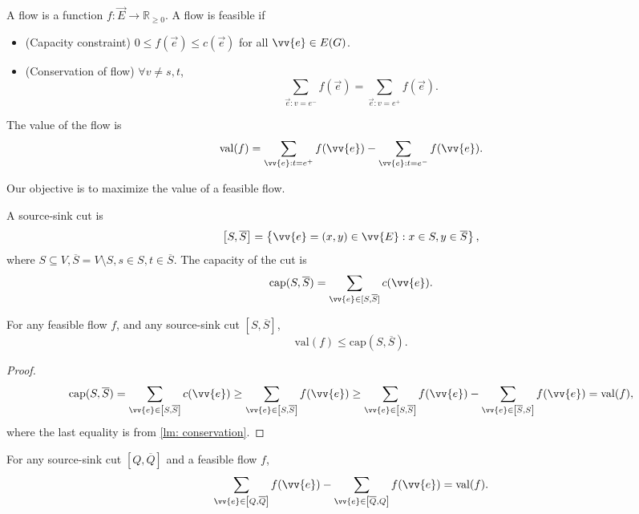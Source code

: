 \begin{definition}
    A flow is a function \(f: \vec{E} \to \mathbb{R} _{\ge 0}\). A flow is feasible if 
    \begin{itemize}
        \item (Capacity constraint) \(0 \le f(\vec{e}) \le c(\vec{e})\) for all \(\vv{e} \in E(G)\). 
        \item (Conservation of flow) \(\forall v \neq s, t\), 
        \[
            \sum_{\vec{e}: v = e^-} f(\vec{e}) = \sum_{\vec{e}: v = e^+} f(\vec{e}). 
        \]
    \end{itemize} 
    The value of the flow is 
    \[
        \mathrm{val}(f) = \sum_{\vv{e}: t = e^+} f(\vv{e}) - \sum_{\vv{e}: t = e^-} f(\vv{e}).   
    \]
\end{definition}

Our objective is to maximize the value of a feasible flow.

\begin{definition}
    A source-sink cut is 
    \[
        \left[ S, \overline{S} \right] = \left\{ \vv{e} = (x, y) \in \vv{E}: x \in S, y \in \overline{S} \right\},  
    \]
    where \(S \subseteq V, \overline{S} = V \setminus S, s \in S, t \in \overline{S}\). The capacity of the cut is 
    \[
        \mathrm{cap}(S, \overline{S}) = \sum_{\vv{e} \in [S, \overline{S}]} c(\vv{e}).  
    \]
\end{definition}

\begin{lemma}
    For any feasible flow \(f\), and any source-sink cut \([S, \overline{S}]\), 
    \[
        \mathrm{val}(f) \le \mathrm{cap}(S, \overline{S}).  
    \]  
\end{lemma}

\begin{proof}
    \begin{align*}
        \mathrm{cap}(S, \overline{S}) = \sum_{\vv{e} \in \left[ S, \overline{S} \right] } c(\vv{e}) \ge \sum_{\vv{e} \in \left[ S, \overline{S}  \right] } f(\vv{e}) \ge \sum_{\vv{e} \in \left[ S, \overline{S}  \right] } f(\vv{e}) - \sum_{\vv{e} \in \left[ \overline{S} , S  \right] } f(\vv{e}) = \mathrm{val}(f),   
    \end{align*}
    where the last equality is from \autoref{lm: conservation}. 
\end{proof}

\begin{lemma}[Conservation] \label{lm: conservation}
    For any source-sink cut \(\left[ Q, \overline{Q} \right] \) and a feasible flow \(f\), 
    \[
        \sum_{\vv{e} \in \left[ Q, \overline{Q} \right] } f(\vv{e}) - \sum_{\vv{e} \in \left[ \overline{Q} , Q \right] } f(\vv{e}) = \mathrm{val}(f).   
    \] 
\end{lemma}

